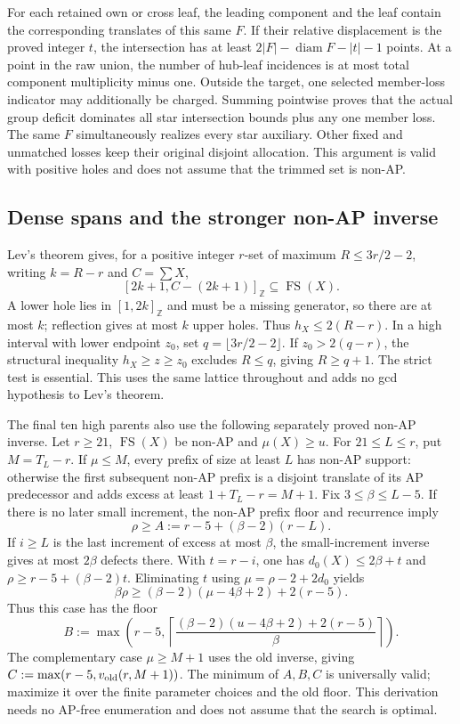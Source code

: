 \documentclass[11pt,a4paper]{article}
\theoremstyle{remark}
\newcommand{\FS}{\operatorname{FS}}
\newcommand{\Z}{\mathbb Z}
\begin{document}
For each retained own or cross leaf, the leading component and the
leaf contain the corresponding translates of this same $F$. If their
relative displacement is the proved integer $t$, the intersection has
at least $2|F|-\operatorname{diam}F-|t|-1$ points. At a point in the
raw union, the number of hub-leaf incidences is at most total component
multiplicity minus one. Outside the target, one selected member-loss
indicator may additionally be charged. Summing pointwise proves that
the actual group deficit dominates all star intersection bounds plus
any one member loss. The same $F$ simultaneously realizes every star
auxiliary. Other fixed and unmatched losses keep their original
disjoint allocation. This argument is valid with positive holes and
does not assume that the trimmed set is non-AP.

\subsection{Dense spans and the stronger non-AP inverse}
Lev's theorem gives, for a positive integer $r$-set
of maximum $R\le3r/2-2$, writing $k=R-r$ and $C=\sum X$,
\[
 [2k+1,C-(2k+1)]_{\Z}\subseteq\FS(X).
\]
A lower hole lies in $[1,2k]_{\Z}$ and must be a missing generator,
so there are at most $k$; reflection gives at most $k$ upper holes.
Thus $h_X\le2(R-r)$. In a high interval with lower endpoint $z_0$,
set $q=\lfloor3r/2-2\rfloor$. If $z_0>2(q-r)$, the structural
inequality $h_X\ge z\ge z_0$ excludes $R\le q$, giving $R\ge q+1$.
The strict test is essential. This uses the same lattice throughout
and adds no gcd hypothesis to Lev's theorem.

The final ten high parents also use the following separately proved
non-AP inverse. Let $r\ge21$, $\FS(X)$ be non-AP and $\mu(X)\ge u$.
For $21\le L\le r$, put $M=T_L-r$. If $\mu\le M$, every prefix of
size at least $L$ has non-AP support: otherwise the first subsequent
non-AP prefix is a disjoint translate of its AP predecessor and adds
excess at least $1+T_L-r=M+1$. Fix $3\le\beta\le L-5$.
If there is no later small increment, the non-AP prefix floor and
recurrence imply
\[
 \rho\ge A:=r-5+(\beta-2)(r-L).
\]
If $i\ge L$ is the last increment of excess at most $\beta$, the
small-increment inverse gives at most $2\beta$ defects there. With
$t=r-i$, one has $d_0(X)\le2\beta+t$ and
$\rho\ge r-5+(\beta-2)t$. Eliminating $t$ using
$\mu=\rho-2+2d_0$ yields
\[
 \beta\rho\ge(\beta-2)(\mu-4\beta+2)+2(r-5).
\]
Thus this case has the floor
\[
 B:=\max\left(r-5,
 \left\lceil\frac{(\beta-2)(u-4\beta+2)+2(r-5)}{\beta}\right\rceil\right).
\]
The complementary case $\mu\ge M+1$ uses the old inverse, giving
$C:=\max(r-5,v_{\rm old}(r,M+1))$.
The minimum of $A,B,C$ is universally valid; maximize it over the
finite parameter choices and the old floor. This derivation needs no
AP-free enumeration and does not assume that the search is optimal.
\end{document}
